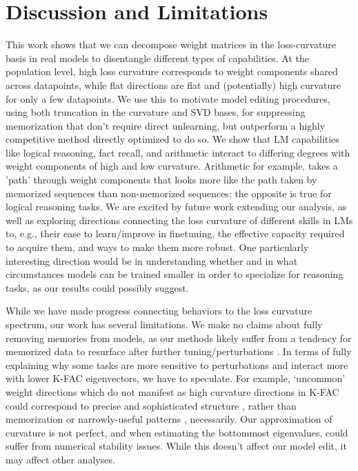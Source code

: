 \documentclass{article} %
\begin{document}
\section{Discussion and Limitations}
This work shows that we can decompose weight matrices in the loss-curvature basis in real models to disentangle different types of capabilities. At the population level, high loss curvature corresponds to weight components shared across datapoints, while flat directions are flat and (potentially) high curvature for only a few datapoints. We use this to motivate model editing procedures, using both truncation in the curvature and SVD bases, for suppressing memorization that don't require direct unlearning, but outperform a highly competitive method directly optimized to do so. We show that LM capabilities like logical reasoning, fact recall, and arithmetic interact to differing degrees with weight components of high and low curvature. Arithmetic for example, takes a 'path' through weight components that looks more like the path taken by memorized sequences than non-memorized sequences; the opposite is true for logical reasoning tasks. We are excited by future work extending our analysis, as well as exploring directions connecting the loss curvature of different skills in LMs to, e.g., their ease to learn/improve in finetuning, the effective capacity required to acquire them, and ways to make them more robust. One particularly interesting direction would be in understanding whether and in what circumstances models can be trained smaller in order to specialize for reasoning tasks, as our results could possibly suggest.

While we have made progress connecting behaviors to the loss curvature spectrum, our work has several limitations. We make no claims about fully removing memories from models, as our methods likely suffer from a tendency for memorized data to resurface after further tuning/perturbations \citep{lee2025distillationrobustifiesunlearning}. In terms of fully explaining why some tasks are more sensitive to perturbations and interact more with lower K-FAC eigenvectors, we have to speculate. For example, `uncommon' weight directions which do not manifest as high curvature directions in K-FAC could correspond to precise and sophisticated structure \citep{kantamneni2025language}, rather than memorization or narrowly-useful patterns \citep{nikankinarithmetic}, necessarily. 
Our approximation of curvature is not perfect, and when estimating the bottommost eigenvalues, could suffer from numerical stability issues. While this doesn't affect our model edit, it may affect other analyses.
\end{document}
